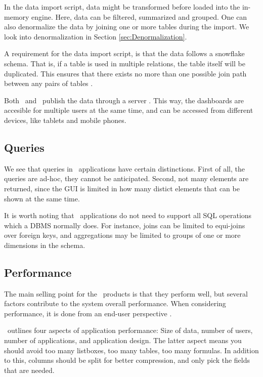 In the data import script, data might be transformed before loaded into the in-memory engine. Here, data can be filtered, summarized and grouped. One can also denormalize the data by joining one or more tables during the import. We look into denormalization in Section \ref{sec:Denormalization}.

A requirement for the data import script, is that the data follows a snowflake schema. That is, if a table is used in multiple relations, the table itself will be duplicated. This ensures that there exists no more than one possible join path between any pairs of tables \cite{noauthor_undated-js}. 

Both \qlikview~and \tableau~publish the data through a server \cite{Kamkolkar2015-iq, Qlik2011-ef}. This way, the dashboards are accesible for multiple users at the same time, and can be accessed from different devices, like tablets and mobile phones.


\subsection{Queries}
\label{sub:Queries}
We see that queries in \bd~applications have certain distinctions. First of all, the queries are ad-hoc, they cannot be anticipated. Second, not many elements are returned, since the GUI is limited in how many distict elements that can be shown at the same time.  

It is worth noting that \bd~applications do not need to support all SQL operations which a DBMS normally does. For instance, joins can be limited to equi-joins over foreign keys, and aggregations may be limited to groups of one or more dimensions in the schema.

\subsection{Performance}
\label{sub:Performance}
The main selling point for the \bd~products is that they perform well, but several factors contribute to the system overall performance. When considering performance, it is done from an end-user perspective \cite{Qlik2011-yc}.

\qlikview~outlines four aspects of application performance: Size of data, number of users, number of applications, and application design. The latter aspect means you should avoid too many listboxes, too many tables, too many formulas. In addition to this, columns should be split for better compression, and only pick the fields that are needed.

